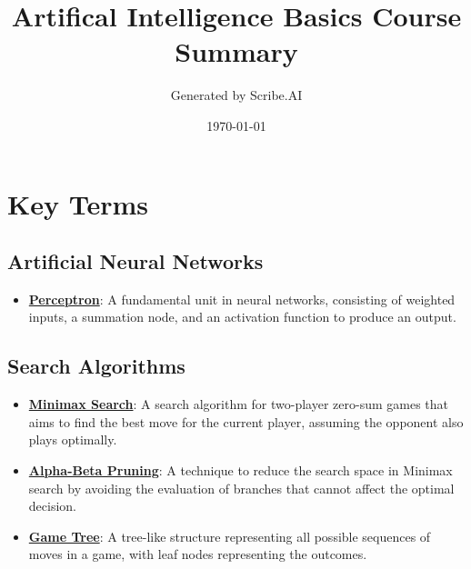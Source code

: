 \documentclass{article}%
\title{Artifical Intelligence Basics Course Summary}%
\author{Generated by Scribe.AI}%
\date{\today}%
\begin{document}
%
\normalsize%
\maketitle%
\section{Key Terms}%
\label{sec:KeyTerms}%
\subsection{Artificial Neural Networks}%
\label{subsec:ArtificialNeuralNetworks}%
\begin{itemize}[leftmargin=*]%
\item \href{\url{https://purdue.brightspace.com/d2l/common/assets/pdfjs-d2l-dist/1.0.14-legacy/web/viewer.html?file=\%252Fcontent\%252Fenforced\%252F1095467-wl.202510.CS.24300.001\%252F02L2-Intro.pdf\%253Fou\%253D1095467\&lang=en-us\&container=d2l-fileviewer-rendered-pdf\&fullscreen=d2l-fileviewer-rendered-pdf-dialog\&height=667}#page=45}{\textbf{Perceptron}}: A fundamental unit in neural networks, consisting of weighted inputs, a summation node, and an activation function to produce an output.%
\end{itemize}

%
\subsection{Search Algorithms}%
\label{subsec:SearchAlgorithms}%
\begin{itemize}[leftmargin=*]%
\item \href{\url{https://purdue.brightspace.com/d2l/common/assets/pdfjs-d2l-dist/1.0.14-legacy/web/viewer.html?file=\%252Fcontent\%252Fenforced\%252F1095467-wl.202510.CS.24300.001\%252F02L2-Intro.pdf\%253Fou\%253D1095467\&lang=en-us\&container=d2l-fileviewer-rendered-pdf\&fullscreen=d2l-fileviewer-rendered-pdf-dialog\&height=667}#page=22}{\textbf{Minimax Search}}: A search algorithm for two-player zero-sum games that aims to find the best move for the current player, assuming the opponent also plays optimally.%
\item \href{\url{https://purdue.brightspace.com/d2l/common/assets/pdfjs-d2l-dist/1.0.14-legacy/web/viewer.html?file=\%252Fcontent\%252Fenforced\%252F1095467-wl.202510.CS.24300.001\%252F02L2-Intro.pdf\%253Fou\%253D1095467\&lang=en-us\&container=d2l-fileviewer-rendered-pdf\&fullscreen=d2l-fileviewer-rendered-pdf-dialog\&height=667}#page=23}{\textbf{Alpha-Beta Pruning}}: A technique to reduce the search space in Minimax search by avoiding the evaluation of branches that cannot affect the optimal decision.%
\item \href{\url{https://purdue.brightspace.com/d2l/common/assets/pdfjs-d2l-dist/1.0.14-legacy/web/viewer.html?file=\%252Fcontent\%252Fenforced\%252F1095467-wl.202510.CS.24300.001\%252F02L2-Intro.pdf\%253Fou\%253D1095467\&lang=en-us\&container=d2l-fileviewer-rendered-pdf\&fullscreen=d2l-fileviewer-rendered-pdf-dialog\&height=667}#page=11}{\textbf{Game Tree}}: A tree-like structure representing all possible sequences of moves in a game, with leaf nodes representing the outcomes.%
\end{itemize}
\end{document}
